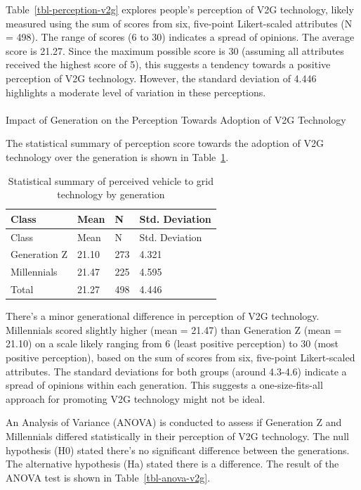 \documentclass[
  letterpaper,
  DIV=11,
  numbers=noendperiod]{scrartcl}
\makeatletter
\let\oldparagraph\paragraph
\renewcommand{\paragraph}{
    \@ifstar
      \xxxParagraphStar
      \xxxParagraphNoStar
  }
\newcommand{\xxxParagraphStar}[1]{\oldparagraph*{#1}\mbox{}}
\newcommand{\xxxParagraphNoStar}[1]{\oldparagraph{#1}\mbox{}}
\makeatother
\begin{document}
Table~\ref{tbl-perception-v2g} explores people's perception of V2G
technology, likely measured using the sum of scores from six, five-point
Likert-scaled attributes (N = 498). The range of scores (6 to 30)
indicates a spread of opinions. The average score is 21.27. Since the
maximum possible score is 30 (assuming all attributes received the
highest score of 5), this suggests a tendency towards a positive
perception of V2G technology. However, the standard deviation of 4.446
highlights a moderate level of variation in these perceptions.

\paragraph{Impact of Generation on the Perception Towards Adoption of
V2G
Technology}\label{impact-of-generation-on-the-perception-towards-adoption-of-v2g-technology}

The statistical summary of perception score towards the adoption of V2G
technology over the generation is shown in
Table~\ref{tbl-v2g-generation}.

\begin{longtable}[]{@{}llll@{}}
\caption{Statistical summary of perceived vehicle to grid technology by
generation}\label{tbl-v2g-generation}\tabularnewline
\toprule\noalign{}
Class & Mean & N & Std. Deviation \\
\midrule\noalign{}
\endfirsthead
\toprule\noalign{}
Class & Mean & N & Std. Deviation \\
\midrule\noalign{}
\endhead
\bottomrule\noalign{}
\endlastfoot
Generation Z & 21.10 & 273 & 4.321 \\
Millennials & 21.47 & 225 & 4.595 \\
Total & 21.27 & 498 & 4.446 \\
\end{longtable}

There's a minor generational difference in perception of V2G technology.
Millennials scored slightly higher (mean = 21.47) than Generation Z
(mean = 21.10) on a scale likely ranging from 6 (least positive
perception) to 30 (most positive perception), based on the sum of scores
from six, five-point Likert-scaled attributes. The standard deviations
for both groups (around 4.3-4.6) indicate a spread of opinions within
each generation. This suggests a one-size-fits-all approach for
promoting V2G technology might not be ideal.

An Analysis of Variance (ANOVA) is conducted to assess if Generation Z
and Millennials differed statistically in their perception of V2G
technology. The null hypothesis (H0) stated there's no significant
difference between the generations. The alternative hypothesis (Ha)
stated there is a difference. The result of the ANOVA test is shown in
Table~\ref{tbl-anova-v2g}.
\end{document}
